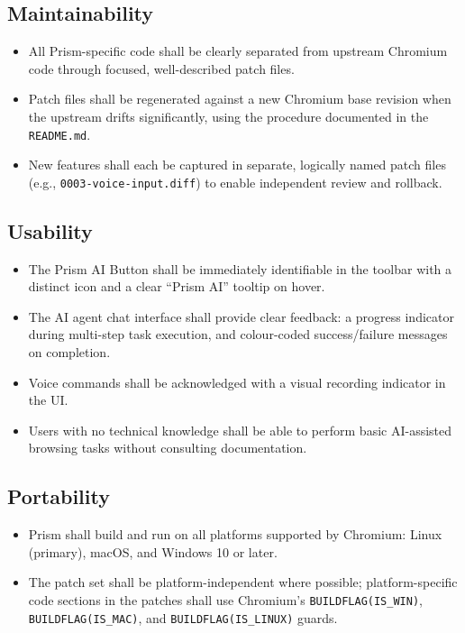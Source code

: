 \subsection{Maintainability}
\begin{itemize}[leftmargin=*]
    \item All Prism-specific code shall be clearly separated from upstream Chromium code through focused, well-described patch files.
    \item Patch files shall be regenerated against a new Chromium base revision when the upstream drifts significantly, using the procedure documented in the \texttt{README.md}.
    \item New features shall each be captured in separate, logically named patch files (e.g., \texttt{0003-voice-input.diff}) to enable independent review and rollback.
\end{itemize}

\subsection{Usability}
\begin{itemize}[leftmargin=*]
    \item The Prism AI Button shall be immediately identifiable in the toolbar with a distinct icon and a clear ``Prism AI'' tooltip on hover.
    \item The AI agent chat interface shall provide clear feedback: a progress indicator during multi-step task execution, and colour-coded success/failure messages on completion.
    \item Voice commands shall be acknowledged with a visual recording indicator in the UI.
    \item Users with no technical knowledge shall be able to perform basic AI-assisted browsing tasks without consulting documentation.
\end{itemize}

\subsection{Portability}
\begin{itemize}[leftmargin=*]
    \item Prism shall build and run on all platforms supported by Chromium: Linux (primary), macOS, and Windows 10 or later.
    \item The patch set shall be platform-independent where possible; platform-specific code sections in the patches shall use Chromium's \texttt{BUILDFLAG(IS\_WIN)}, \texttt{BUILDFLAG(IS\_MAC)}, and \texttt{BUILDFLAG(IS\_LINUX)} guards.
\end{itemize}

